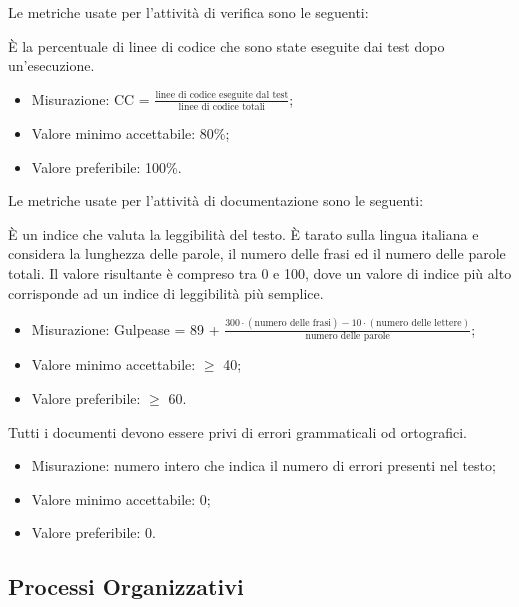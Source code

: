 	Le metriche usate per l'attività di verifica sono le seguenti:
	
		 È la percentuale di linee di codice che sono state eseguite dai test dopo un’esecuzione.
		 \begin{itemize}
			\item{Misurazione: CC = $\displaystyle\frac{\mbox{linee di codice eseguite dal test}}{\mbox{linee di codice totali}}$;}
			\item{Valore minimo accettabile: 80\%;}
			\item{Valore preferibile: 100\%.}
		\end{itemize}
	
	Le metriche usate per l'attività di documentazione sono le seguenti:
	
		È un indice che valuta la leggibilità del testo. È tarato sulla lingua italiana e considera la lunghezza delle parole, il numero delle frasi ed il numero delle parole totali. Il valore risultante è compreso tra 0 e 100, dove un valore di indice più alto corrisponde ad un indice di leggibilità più semplice.
		 \begin{itemize}
			\item{Misurazione: Gulpease = 89 + $\displaystyle\frac{300 \cdot{} (\mbox{numero delle frasi}) - 10 \cdot{} (\mbox{numero delle lettere})}{\mbox{numero delle parole}}$;}
			\item{Valore minimo accettabile: $\geq$ 40;}
			\item{Valore preferibile: $\geq$ 60.}
		\end{itemize}

		Tutti i documenti devono essere privi di errori grammaticali od ortografici.
		\begin{itemize}
			\item{Misurazione: numero intero che indica il numero di errori presenti nel testo;}
			\item{Valore minimo accettabile: 0;}
			\item{Valore preferibile: 0.}
		\end{itemize}

\subsection{Processi Organizzativi}
